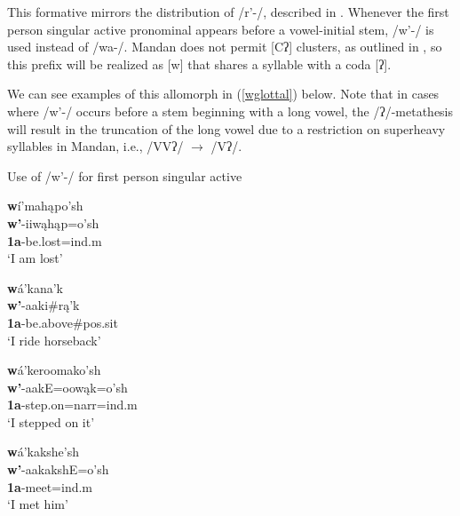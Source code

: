 This formative mirrors the distribution of /r'-/, described in . Whenever the first person singular active pronominal appears before a vowel-initial stem, /w'-/ is used instead of /wa-/. Mandan does not permit [Cʔ] clusters, as outlined in , so this prefix will be realized as [w] that shares a syllable with a coda [ʔ].

We can see examples of this allomorph in (\ref{wglottal}) below. Note that in cases where /w'-/ occurs before a stem beginning with a long vowel, the /ʔ/-metathesis will result in the truncation of the long vowel due to a restriction on superheavy syllables in Mandan, i.e., /VVʔ/ $\to$ /Vʔ/.



\begin{exe}
\item\label{wglottal} Use of /w'-/ for first person singular active

	\begin{xlist}
	
	\item \glll \textbf{w}í'mahąpo'sh\\
	\textbf{w'}-iiwąhąp=o'sh\\
	\textbf{1a}-\textnormal{be.lost}=ind.m\\
	\glt `I am lost' \citep[96]{hollow1970}
	
	\item \glll \textbf{w}á'kana'k\\
	\textbf{w'}-aaki\#rą'k\\
	\textbf{1a}-\textnormal{be.above}\#pos.sit\\
	\glt `I ride horseback' \citep[59]{hollow1970}
	
	\item \glll \textbf{w}á'keroomako'sh\\
	\textbf{w'}-aakE=oowąk=o'sh\\
	\textbf{1a}-\textnormal{step.on}=narr=ind.m\\
	\glt `I stepped on it' \citep[128]{trechter2012b}
	
	\item \glll \textbf{w}á'kakshe'sh\\
	\textbf{w'}-aakakshE=o'sh\\
	\textbf{1a}-\textnormal{meet}=ind.m\\
	\glt `I met him' \citep[3]{kennard1936}
	
	\end{xlist}

\end{exe}

